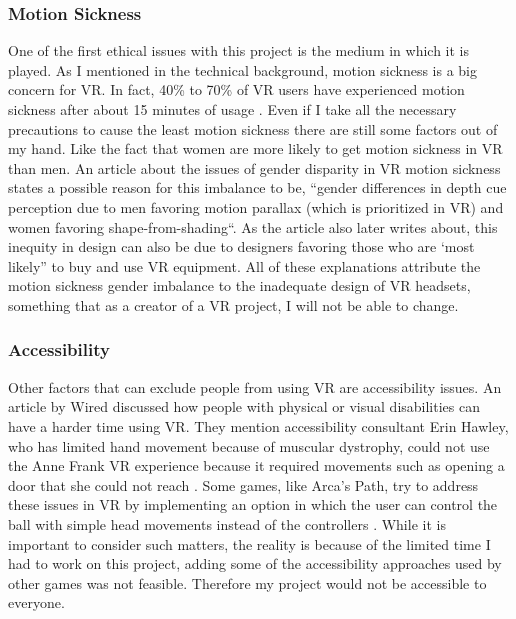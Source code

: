 \documentclass[10pt,twocolumn]{article}
\begin{document}
\subsubsection{Motion Sickness}
One of the first ethical issues with this project is the medium in which it is played. As I mentioned in the technical background, motion sickness is a big concern for VR. In fact, 40\% to 70\% of VR users have experienced motion sickness after about 15 minutes of usage \cite{motionsicknessvr2019}. Even if I take all the necessary precautions to cause the least motion sickness there are still some factors out of my hand. Like the fact that women are more likely to get motion sickness in VR than men. An article about the issues of gender disparity in VR motion sickness states a possible reason for this imbalance to be, “gender differences in depth cue perception due to men favoring motion parallax (which is prioritized in VR) and women favoring shape-from-shading“\cite{vrbarriers2018}. As the article also later writes about, this inequity in design can also be due to designers favoring those who are ‘most likely” to buy and use VR equipment\cite{vrbarriers2018}. All of these explanations attribute the motion sickness gender imbalance to the inadequate design of VR headsets, something that as a creator of a VR project, I will not be able to change. 

\subsubsection{Accessibility}
Other factors that can exclude people from using VR are accessibility issues. An article by Wired discussed how people with physical or visual disabilities can have a harder time using VR. They mention accessibility consultant Erin Hawley, who has limited hand movement because of muscular dystrophy, could not use the Anne Frank VR experience because it required movements such as opening a door that she could not reach \cite{vraccessibility2022}. Some games, like Arca’s Path, try to address these issues in VR by implementing an option in which the user can control the ball with simple head movements instead of the controllers \cite{arcaspath2018}. While it is important to consider such matters, the reality is because of the limited time I had to work on this project, adding some of the accessibility approaches used by other games was not feasible. Therefore my project would not be accessible to everyone.
\end{document}
